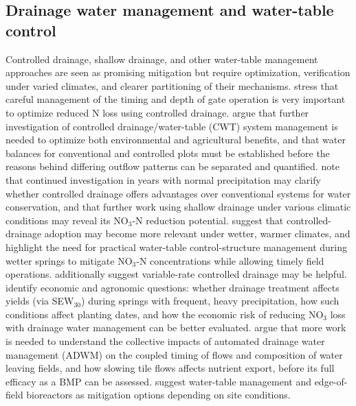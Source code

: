 \subsection{Drainage water management and water-table control}
Controlled drainage, shallow drainage, and other water-table management approaches are seen as promising mitigation but require optimization, verification under varied climates, and clearer partitioning of their mechanisms. \textcite{Fang2012} stress that careful management of the timing and depth of gate operation is very important to optimize reduced N loss using controlled drainage. \textcite{Wesström2001} argue that further investigation of controlled drainage/water-table (CWT) system management is needed to optimize both environmental and agricultural benefits, and that water balances for conventional and controlled plots must be established before the reasons behind differing outflow patterns can be separated and quantified. \textcite{Smith2011b} note that continued investigation in years with normal precipitation may clarify whether controlled drainage offers advantages over conventional systems for water conservation, and that further work using shallow drainage under various climatic conditions may reveal its NO$_3$-N reduction potential. \textcite{Madramootoo2024} suggest that controlled-drainage adoption may become more relevant under wetter, warmer climates, and highlight the need for practical water-table control-structure management during wetter springs to mitigate NO$_3$-N concentrations while allowing timely field operations. \textcite{Bakhsh2007} additionally suggest variable-rate controlled drainage may be helpful. \textcite{Schott2017b} identify economic and agronomic questions: whether drainage treatment affects yields (via SEW$_{30}$) during springs with frequent, heavy precipitation, how such conditions affect planting dates, and how the economic risk of reducing NO$_3$ loss with drainage water management can be better evaluated. \textcite{Miller2022} argue that more work is needed to understand the collective impacts of automated drainage water management (ADWM) on the coupled timing of flows and composition of water leaving fields, and how slowing tile flows affects nutrient export, before its full efficacy as a BMP can be assessed. \textcite{Barkle2021} suggest water-table management and edge-of-field bioreactors as mitigation options depending on site conditions.

